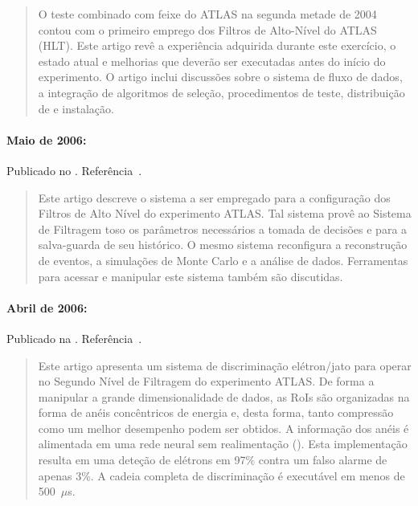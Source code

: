 \begin{quotation}
O teste combinado com feixe do ATLAS na segunda metade de 2004 contou com o
primeiro emprego dos Filtros de Alto-Nível do ATLAS (HLT). Este artigo revê a
experiência adquirida durante este exercício, o estado atual e melhorias que
deverão ser executadas antes do início do experimento. O artigo inclui
discussões sobre o sistema de fluxo de dados, a integração de algoritmos de
seleção, procedimentos de teste, distribuição de  e instalação.
\end{quotation}

\paragraph{Maio de 2006: } Publicado no . Referência~\cite{aa:jinst-06}.

\begin{quotation}
Este artigo descreve o sistema a ser empregado para a configuração dos Filtros
de Alto Nível do experimento ATLAS. Tal sistema provê ao Sistema de Filtragem
toso os parâmetros necessários a tomada de decisões e para a salva-guarda de
seu histórico. O mesmo sistema reconfigura a reconstrução de eventos, a
simulações de Monte Carlo e a análise de dados. Ferramentas para acessar e
manipular este sistema também são discutidas.
\end{quotation}

\paragraph{Abril de 2006: } Publicado na . Referência~\cite{aa:nim-06}.

\begin{quotation}
Este artigo apresenta um sistema de discriminação elétron/jato para operar no
Segundo Nível de Filtragem do experimento ATLAS. De forma a manipular a grande
dimensionalidade de dados, as RoIs são organizadas na forma de anéis
concêntricos de energia e, desta forma, tanto compressão como um melhor
desempenho podem ser obtidos. A informação dos anéis é alimentada em uma rede
neural sem realimentação (). Esta implementação resulta em
uma deteção de elétrons em 97\% contra um falso alarme de apenas 3\%. A cadeia
completa de discriminação é executável em menos de 500~$\mu$s.
\end{quotation}

